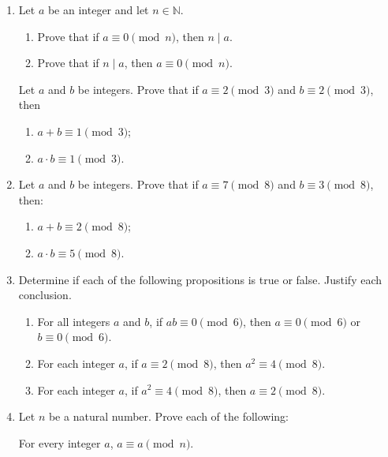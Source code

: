 \begin{enumerate}
\item Let  $a$ be an integer and let $n \in \mathbb{N}$.  

  \begin{enumerate}
    \item Prove that if  $a \equiv 0 \pmod n$, then $ n \mid a $.
    \item Prove that if  $ n \mid a $, then  $a \equiv 0 \pmod n$.
  \end{enumerate}


\xitem Let $a$ and $b$ be integers.  Prove that if $a \equiv 2 \pmod 3$ and $b \equiv 2 \pmod 3$, then
\label{exer:congmod3}%

\begin{multicols}{2}
\begin{enumerate}
\item $a + b \equiv 1 \pmod 3$;

\item $a \cdot b \equiv 1 \pmod 3$.
\end{enumerate}
\end{multicols}

\item Let $a$ and $b$ be integers.  Prove that if $a \equiv 7 \pmod 8$ and $b \equiv 3 \pmod 8$, then:

\begin{multicols}{2}
\begin{enumerate}
\item $a + b \equiv 2 \pmod 8$;

\item $a \cdot b \equiv 5 \pmod 8$.
\end{enumerate}
\end{multicols}

\item Determine if each of the following propositions is true or false.  Justify each conclusion.

\begin{enumerate}
\item For all integers $a$ and $b$, if $ab \equiv 0 \pmod 6$, then $a \equiv 0 \pmod 6$ or  
$b \equiv 0 \pmod 6$. 
\item For each integer $a$, if $a \equiv 2 \pmod 8$, then $a^2 \equiv 4 \pmod 8$.
\item For each integer $a$, if $a^2 \equiv 4 \pmod 8$, then $a \equiv 2 \pmod 8$.
\end{enumerate}

\newpage
\item Let  $n$ be a natural number.  Prove each of the following:   \label{exer:cong-props}
\begin{enumerate}
  \yitem For every integer  $a$,  $a \equiv a \pmod n$. \label{exer:cong-reflexive}


\end{enumerate}
\end{enumerate}
